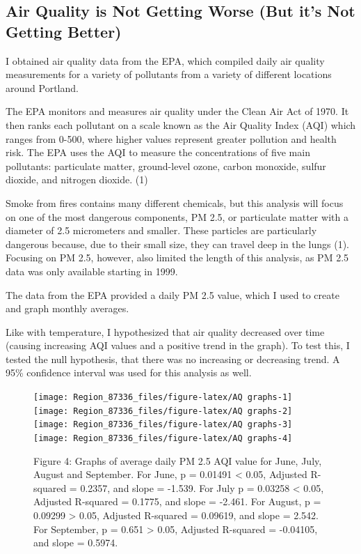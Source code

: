 \documentclass[]{article}
\begin{document}
\hypertarget{air-quality-is-not-getting-worse-but-its-not-getting-better}{%
\subsection{Air Quality is Not Getting Worse (But it's Not Getting
Better)}\label{air-quality-is-not-getting-worse-but-its-not-getting-better}}

I obtained air quality data from the EPA, which compiled daily air
quality measurements for a variety of pollutants from a variety of
different locations around Portland.

The EPA monitors and measures air quality under the Clean Air Act of
1970. It then ranks each pollutant on a scale known as the Air Quality
Index (AQI) which ranges from 0-500, where higher values represent
greater pollution and health risk. The EPA uses the AQI to measure the
concentrations of five main pollutants: particulate matter, ground-level
ozone, carbon monoxide, sulfur dioxide, and nitrogen dioxide. (1)

Smoke from fires contains many different chemicals, but this analysis
will focus on one of the most dangerous components, PM 2.5, or
particulate matter with a diameter of 2.5 micrometers and smaller. These
particles are particularly dangerous because, due to their small size,
they can travel deep in the lungs (1). Focusing on PM 2.5, however, also
limited the length of this analysis, as PM 2.5 data was only available
starting in 1999.

The data from the EPA provided a daily PM 2.5 value, which I used to
create and graph monthly averages.

Like with temperature, I hypothesized that air quality decreased over
time (causing increasing AQI values and a positive trend in the graph).
To test this, I tested the null hypothesis, that there was no increasing
or decreasing trend. A 95\% confidence interval was used for this
analysis as well.

\begin{figure}
\texttt{[image: Region\_87336\_files/figure-latex/AQ graphs-1]} \texttt{[image: Region\_87336\_files/figure-latex/AQ graphs-2]} \texttt{[image: Region\_87336\_files/figure-latex/AQ graphs-3]} \texttt{[image: Region\_87336\_files/figure-latex/AQ graphs-4]} \caption{Figure 4: Graphs of average daily PM 2.5 AQI value for June, July, August and September. For June, p = 0.01491 < 0.05, Adjusted R-squared = 0.2357, and slope = -1.539. For July p = 0.03258 < 0.05, Adjusted R-squared = 0.1775, and slope = -2.461. For August, p = 0.09299 > 0.05, Adjusted R-squared = 0.09619, and slope = 2.542. For September, p = 0.651 > 0.05, Adjusted R-squared = -0.04105, and slope = 0.5974. }\label{fig:AQ graphs}
\end{figure}
\end{document}
